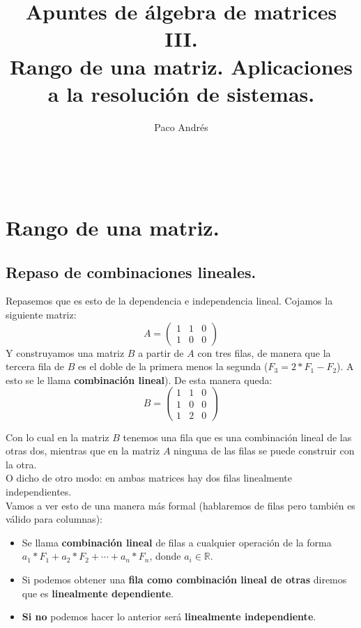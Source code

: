 \documentclass[a4paper,11pt,answers]{exam}
\def \autor{Paco Andrés}
\def \titulo{Apuntes de álgebra de matrices III.\\Rango de una matriz. Aplicaciones a la resolución de sistemas.}
\begin{document}
\title{\titulo}
\date{}
\author{\autor}
\maketitle

\begin{center}
\doclicenseLongText\\
\vspace{.25cm}
\doclicenseImage
\end{center}
\section{Rango de una matriz.}
\subsection{Repaso de combinaciones lineales.}
Repasemos que es esto de la dependencia e independencia lineal. Cojamos la siguiente matriz:
\[A=\left(\begin{array}{rrr}
	1&1&0\\
	1&0&0
\end{array}\right)\]
Y construyamos una matriz $B$ a partir de $A$ con tres filas, de manera que la tercera fila de $B$ es el doble de la primera menos la segunda ($F_3 = 2*F_1 - F_2$). A esto se le llama \textbf{combinación lineal}). De esta manera queda:
\[B=\left(\begin{array}{rrr}
	1&1&0\\
	1&0&0\\
	1&2&0
\end{array}\right)\]

Con lo cual en la matriz $B$ tenemos una fila que es una combinación lineal de las otras dos, mientras que en la matriz $A$ ninguna de las filas se puede construir con la otra.\\
O dicho de otro modo: en ambas matrices hay dos filas linealmente independientes.\\

Vamos a ver esto de una manera más formal (hablaremos de filas pero también es válido para columnas):\\
\begin{itemize}
	\item Se llama \textbf{combinación lineal} de filas a cualquier operación de la forma $a_1*F_1 + a_2*F_2 + \cdots + a_n*F_n$, donde $a_i \in \mathbb{R}$.
	\item Si podemos obtener una \textbf{fila como combinación lineal de otras} diremos que es \textbf{linealmente dependiente}.
	\item \textbf{Si no} podemos hacer lo anterior será \textbf{linealmente independiente}.
\end{itemize}
\end{document}

